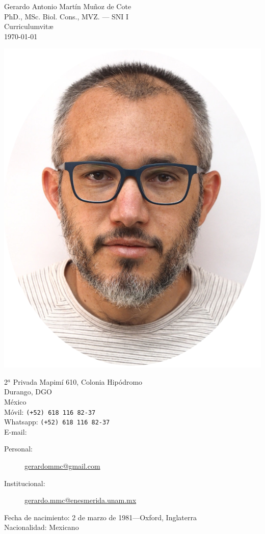 \documentclass[11pt, letter]{article}
\begin{document}
{\LARGE Gerardo Antonio Mart\'in Mu\~noz de Cote \orcidA{}}\\ [0.5cm]
{\small PhD., MSc. Biol. Cons., MVZ. --- SNI I}\\[0.5cm]
{\large Curriculumvit\ae}\\
{\small \today}\\[0.5cm]

\begin{multicols}{2}
\begin{center}
	\includegraphics[width=.7\linewidth]{yo}
\end{center}

2$^a$ Privada Mapim\'i 610, Colonia Hip\'odromo\\
Durango, DGO\\
M\'exico\\[.2cm]
M\'ovil: \texttt{(+52) 618 116 82-37}\\
Whatsapp: \texttt{(+52) 618 116 82-37}\\
E-mail:
\begin{description}
	\item[Personal:] \href{mailto:gerardommc@gmail.com}{gerardommc@gmail.com}
	\item[Institucional:] \href{mailto:gerardo.mmc@enesmerida.unam.mx}{gerardo.mmc@enesmerida.unam.mx}
\end{description}
Fecha de nacimiento:  2 de marzo de 1981---Oxford, Inglaterra\\
Nacionalidad:  Mexicano

\end{multicols}
\end{document}
